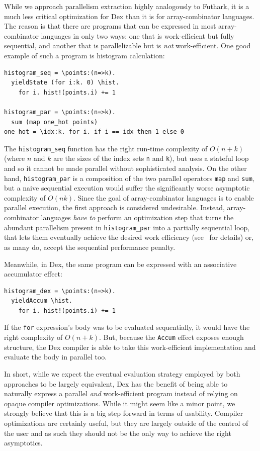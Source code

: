 \documentclass[acmsmall,screen,nonacm]{acmart}
\newlength{\codeindent}
\begin{document}
While we approach parallelism extraction highly analogously to Futhark, it is a much less critical optimization for Dex than it is for array-combinator languages.
The reason is that there are programs that can be expressed in most array-combinator languages in only two ways: one that is work-efficient but fully sequential, and another that is parallelizable but is \emph{not} work-efficient.
One good example of such a program is histogram calculation:
\begin{Verbatim}[xleftmargin=\codeindent,fontsize=\small]
histogram_seq = \points:(n=>k).
  yieldState (for i:k. 0) \hist.
    for i. hist!(points.i) += 1

histogram_par = \points:(n=>k).
  sum (map one_hot points)
one_hot = \idx:k. for i. if i == idx then 1 else 0
\end{Verbatim}
The \verb|histogram_seq| function has the right run-time complexity of $O(n + k)$ (where $n$ and $k$ are the sizes of the index sets \verb|n| and \verb|k|), but uses a stateful loop and so it cannot be made parallel without sophisticated analysis.
On the other hand, \verb|histogram_par| is a composition of the two parallel operators \texttt{map} and \texttt{sum}, but a naive sequential execution would suffer the significantly worse asymptotic complexity of $O(nk)$.
Since the goal of array-combinator languages is to enable parallel execution, the first approach is considered undesirable.
Instead, array-combinator languages \emph{have to} perform an optimization step that turns the abundant parallelism present in \verb|histogram_par| into a partially sequential loop, that lets them eventually achieve the desired work efficiency (see~\citet{henriksen2017futhark} for details) or, as many do, accept the sequential performance penalty.

Meanwhile, in Dex, the same program can be expressed with an associative accumulator effect:
\begin{Verbatim}[xleftmargin=\codeindent,fontsize=\small]
histogram_dex = \points:(n=>k).
  yieldAccum \hist.
    for i. hist!(points.i) += 1
\end{Verbatim}
If the \texttt{for} expression's body was to be evaluated sequentially, it would have the right complexity of $O(n + k)$.
But, because the \texttt{Accum} effect exposes enough structure, the Dex compiler is able to take this work-efficient implementation and evaluate the body in parallel too.

In short, while we expect the eventual evaluation strategy employed by both approaches to be largely equivalent, Dex has the benefit of being able to naturally express a parallel \emph{and} work-efficient program instead of relying on opaque compiler optimizations.
While it might seem like a minor point, we strongly believe that this is a big step forward in terms of usability.
Compiler optimizations are certainly useful, but they are largely outside of the control of the user and as such they should not be the only way to achieve the right asymptotics.
\end{document}
